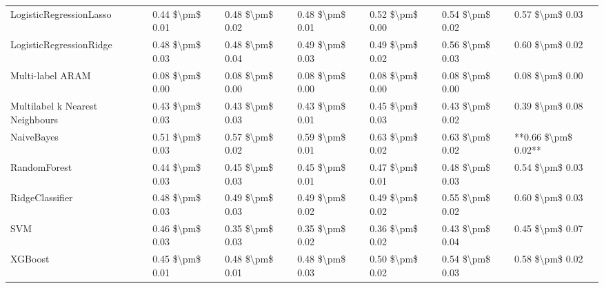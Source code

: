 \begin{tabular}{lllllll}
LogisticRegressionLasso         &  0.44 \$\textbackslash pm\$ 0.01 &           0.48 \$\textbackslash pm\$ 0.02 &       0.48 \$\textbackslash pm\$ 0.01 &        0.52 \$\textbackslash pm\$ 0.00 &                         0.54 \$\textbackslash pm\$ 0.02 &      0.57 \$\textbackslash pm\$ 0.03 \\
LogisticRegressionRidge         &  0.48 \$\textbackslash pm\$ 0.03 &           0.48 \$\textbackslash pm\$ 0.04 &       0.49 \$\textbackslash pm\$ 0.03 &        0.49 \$\textbackslash pm\$ 0.02 &                         0.56 \$\textbackslash pm\$ 0.03 &      0.60 \$\textbackslash pm\$ 0.02 \\
Multi-label ARAM                &  0.08 \$\textbackslash pm\$ 0.00 &           0.08 \$\textbackslash pm\$ 0.00 &       0.08 \$\textbackslash pm\$ 0.00 &        0.08 \$\textbackslash pm\$ 0.00 &                         0.08 \$\textbackslash pm\$ 0.00 &      0.08 \$\textbackslash pm\$ 0.00 \\
Multilabel k Nearest Neighbours &  0.43 \$\textbackslash pm\$ 0.03 &           0.43 \$\textbackslash pm\$ 0.03 &       0.43 \$\textbackslash pm\$ 0.01 &        0.45 \$\textbackslash pm\$ 0.03 &                         0.43 \$\textbackslash pm\$ 0.02 &      0.39 \$\textbackslash pm\$ 0.08 \\
NaiveBayes                      &  0.51 \$\textbackslash pm\$ 0.03 &           0.57 \$\textbackslash pm\$ 0.02 &       0.59 \$\textbackslash pm\$ 0.01 &        0.63 \$\textbackslash pm\$ 0.02 &                         0.63 \$\textbackslash pm\$ 0.02 &  **0.66 \$\textbackslash pm\$ 0.02** \\
RandomForest                    &  0.44 \$\textbackslash pm\$ 0.03 &           0.45 \$\textbackslash pm\$ 0.03 &       0.45 \$\textbackslash pm\$ 0.01 &        0.47 \$\textbackslash pm\$ 0.01 &                         0.48 \$\textbackslash pm\$ 0.03 &      0.54 \$\textbackslash pm\$ 0.03 \\
RidgeClassifier                 &  0.48 \$\textbackslash pm\$ 0.03 &           0.49 \$\textbackslash pm\$ 0.03 &       0.49 \$\textbackslash pm\$ 0.02 &        0.49 \$\textbackslash pm\$ 0.02 &                         0.55 \$\textbackslash pm\$ 0.02 &      0.60 \$\textbackslash pm\$ 0.03 \\
SVM                             &  0.46 \$\textbackslash pm\$ 0.03 &           0.35 \$\textbackslash pm\$ 0.03 &       0.35 \$\textbackslash pm\$ 0.02 &        0.36 \$\textbackslash pm\$ 0.02 &                         0.43 \$\textbackslash pm\$ 0.04 &      0.45 \$\textbackslash pm\$ 0.07 \\
XGBoost                         &  0.45 \$\textbackslash pm\$ 0.01 &           0.48 \$\textbackslash pm\$ 0.01 &       0.48 \$\textbackslash pm\$ 0.03 &        0.50 \$\textbackslash pm\$ 0.02 &                         0.54 \$\textbackslash pm\$ 0.03 &      0.58 \$\textbackslash pm\$ 0.02 \\
\bottomrule
\end{tabular}

